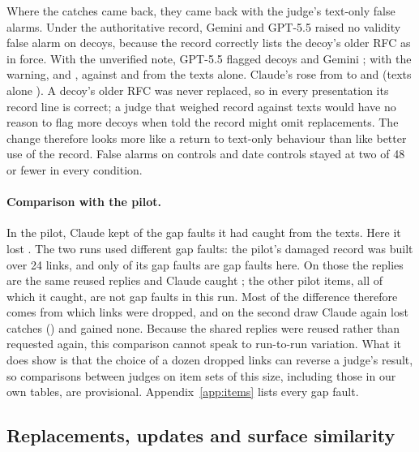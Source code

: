 Where the catches came back, they came back with the judge's text-only false alarms. Under the authoritative record,
Gemini and GPT-5.5 raised no validity false alarm on decoys, because the record correctly lists the decoy's older RFC as
in force. With the unverified note, GPT-5.5 flagged \EGPTDecoyFALowauth{} decoys and Gemini \EGeminiDecoyFALowauth; with
the warning, \EGPTDecoyFACaveat{} and \EGeminiDecoyFACaveat, against \EGPTDecoyFATexts{} and \EGeminiDecoyFATexts{}
from the texts alone. Claude's rose from \EOpusDecoyFADamaged{} to \EOpusDecoyFALowauth{} and \EOpusDecoyFACaveat{}
(texts alone \EOpusDecoyFATexts). A decoy's older RFC was never replaced, so in every presentation its record line is
correct; a judge that weighed record against texts would have no reason to flag more decoys when told the
record might omit replacements. The change therefore looks more like a return to text-only behaviour than like better
use of the record. False alarms on controls and date controls stayed at two of 48 or fewer in every condition.

\paragraph{Comparison with the pilot.} In the pilot, Claude kept \RfcDeferWithStatusDamagedClaudeOpusFourFive{} of the
\RfcDeferOwnStatusDamagedClaudeOpusFourFive{} gap faults it had caught from the texts. Here it lost
\EOpusHTwoaLost. The two runs used different gap faults: the pilot's damaged record was built over 24 links, and only
\EOpusPilotShared{} of its \EOpusPilotPilotItems{} gap faults are gap faults here. On those \EOpusPilotShared{} the
replies are the same reused replies and Claude caught \EOpusPilotSharedCaught; the other \EOpusPilotPilotOnly{} pilot
items, all of which it caught, are not gap faults in this run. Most of the difference therefore comes from which links
were dropped, and on the second draw Claude again lost catches (\EOpusSOneLost) and gained none. Because the shared
replies were reused rather than requested again, this comparison cannot speak to run-to-run variation. What it does
show is that the choice of a dozen dropped links can reverse a judge's result, so comparisons between judges on item
sets of this size, including those in our own tables, are provisional.
Appendix~\ref{app:items} lists every gap fault.

\subsection{Replacements, updates and surface similarity}
\label{sec:res-shortcut}

